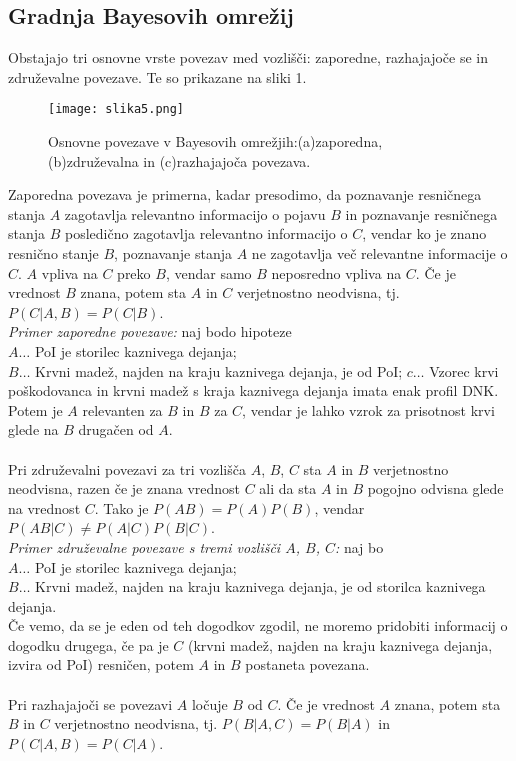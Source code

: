 \documentclass[12pt,a4paper]{amsart}
\theoremstyle{definition} %
\theoremstyle{plain} %
\begin{document}
\subsection{Gradnja Bayesovih omrežij}
Obstajajo tri osnovne vrste povezav med vozlišči: zaporedne, razhajajoče se in združevalne povezave. Te so prikazane na sliki 1. \\
\begin{figure}[!ht]\label{fig:slika2}
    \centering
    \texttt{[image: slika5.png]}
    \caption{Osnovne povezave v Bayesovih omrežjih:(a)zaporedna, (b)združevalna in (c)razhajajoča povezava.}\vspace{2mm}
\end{figure}
Zaporedna povezava je primerna, kadar presodimo, da poznavanje resničnega stanja $A$ zagotavlja relevantno informacijo o pojavu $B$ in poznavanje 
resničnega stanja $B$ posledično zagotavlja relevantno informacijo o $C$, vendar ko je znano resnično stanje $B$, poznavanje stanja $A$ ne 
zagotavlja več relevantne informacije o $C$. $A$ vpliva na $C$ preko $B$, vendar samo $B$ neposredno vpliva na $C$. Če je vrednost $B$ znana, 
potem sta $A$ in $C$ verjetnostno neodvisna, tj. $P(C \lvert A, B) = P(C \lvert B)$.\\
\textit{Primer zaporedne povezave:} naj bodo hipoteze\\
$A \dots$ PoI je storilec kaznivega dejanja;\\
$B \dots$ Krvni madež, najden na kraju kaznivega dejanja, je od PoI;
$c \dots$ Vzorec krvi poškodovanca in krvni madež s kraja kaznivega dejanja imata enak profil DNK. \\
Potem je $A$ relevanten za $B$ in $B$ za $C$, vendar je lahko vzrok za prisotnost krvi glede na $B$ drugačen od $A$.\\\\
Pri združevalni povezavi za tri vozlišča $A$, $B$, $C$ sta $A$ in $B$ verjetnostno neodvisna, razen če je znana vrednost $C$ ali da sta $A$ in $B$ 
pogojno odvisna glede na vrednost $C$. Tako je $P(AB) = P(A) P(B)$, vendar $P(AB \lvert C) \ne P(A \lvert C) P(B \lvert C)$.\\
\textit{Primer združevalne povezave s tremi vozlišči $A$, $B$, $C$:} naj bo\\
$A \dots$ PoI je storilec kaznivega dejanja;\\
$B \dots$ Krvni madež, najden na kraju kaznivega dejanja, je od storilca kaznivega dejanja.\\ 
Če vemo, da se je eden od teh dogodkov zgodil, ne moremo pridobiti informacij o dogodku drugega, če pa je $C$ (krvni madež, najden na kraju 
kaznivega dejanja, izvira od PoI) resničen, potem $A$ in $B$ postaneta povezana.\\\\
Pri razhajajoči se povezavi $A$ ločuje $B$ od $C$. Če je vrednost $A$ znana, potem sta $B$ in $C$ verjetnostno neodvisna, tj. 
$P(B \lvert A, C) = P(B \lvert A)$ in $P(C \lvert A, B) = P(C \lvert A)$.\\\\
\end{document}

